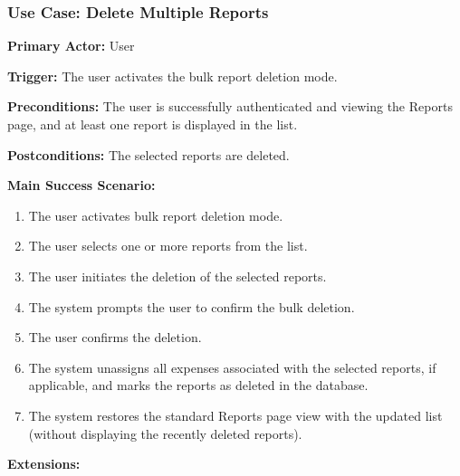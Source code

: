 \subsubsection{\textbf{Use Case: Delete Multiple Reports}}

\textbf{Primary Actor:} User

\textbf{Trigger:} The user activates the bulk report deletion mode.

\textbf{Preconditions:} The user is successfully authenticated and viewing the Reports page, and at least one report is displayed in the list.

\textbf{Postconditions:} The selected reports are deleted.

\vspace{0.5cm}

\textbf{Main Success Scenario:}

\begin{enumerate} [leftmargin=0.75cm, noitemsep]
\item The user activates bulk report deletion mode.
\item The user selects one or more reports from the list.
\item The user initiates the deletion of the selected reports.
\item The system prompts the user to confirm the bulk deletion.
\item The user confirms the deletion.
\item The system unassigns all expenses associated with the selected reports, if applicable, and marks the reports as deleted in the database.
\item The system restores the standard Reports page view with the updated list (without displaying the recently deleted reports).
\end{enumerate}

\vspace{0.3cm}

\textbf{Extensions:}

